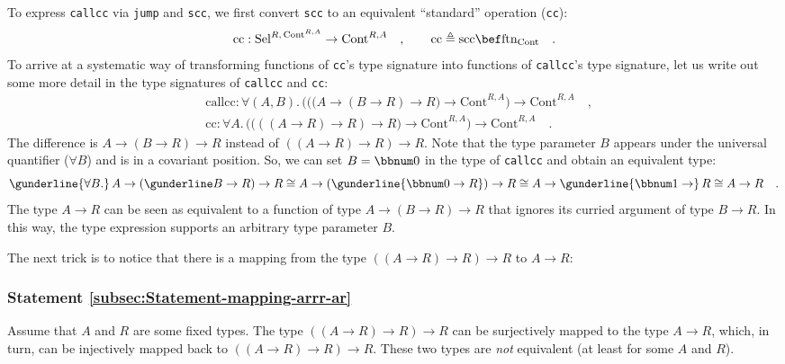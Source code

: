To express \lstinline!callcc! via \lstinline!jump! and \lstinline!scc!,
we first convert \lstinline!scc! to an equivalent \textsf{``}standard\textsf{''}
operation (\lstinline!cc!):
\[
\text{cc}:\text{Sel}^{R,\,\text{Cont}^{R,A}}\rightarrow\text{Cont}^{R,A}\quad,\quad\quad\text{cc}\triangleq\text{scc}\bef\text{ftn}_{\text{Cont}}\quad.
\]
To arrive at a systematic way of transforming functions of \lstinline!cc!\textsf{'}s
type signature into functions of \lstinline!callcc!\textsf{'}s type signature,
let us write out some more detail in the type signatures of \lstinline!callcc!
and \lstinline!cc!:
\begin{align*}
 & \text{callcc}:\forall(A,B).\,\big(\big((A\rightarrow(B\rightarrow R)\rightarrow R\big)\rightarrow\text{Cont}^{R,A}\big)\rightarrow\text{Cont}^{R,A}\quad,\\
 & \text{cc}:\forall A.\,\big(\big(((A\rightarrow R)\rightarrow R)\rightarrow R\big)\rightarrow\text{Cont}^{R,A}\big)\rightarrow\text{Cont}^{R,A}\quad.
\end{align*}
The difference is $A\rightarrow(B\rightarrow R)\rightarrow R$ instead
of $((A\rightarrow R)\rightarrow R)\rightarrow R$. Note that the
type parameter $B$ appears under the universal quantifier ($\forall B$)
and is in a covariant position. So, we can set $B=\bbnum 0$ in the
type of \lstinline!callcc! and obtain an equivalent type:
\[
\gunderline{\forall B.}\,A\rightarrow(\gunderline B\rightarrow R)\rightarrow R\cong A\rightarrow(\gunderline{\bbnum 0\rightarrow R})\rightarrow R\cong A\rightarrow\gunderline{\bbnum 1\rightarrow}\,R\cong A\rightarrow R\quad.
\]
The type $A\rightarrow R$ can be seen as equivalent to a function
of type $A\rightarrow(B\rightarrow R)\rightarrow R$ that ignores
its curried argument of type $B\rightarrow R$. In this way, the type
expression supports an arbitrary type parameter $B$.

The next trick is to notice that there is a mapping from the type
$((A\rightarrow R)\rightarrow R)\rightarrow R$ to $A\rightarrow R$:

\subsubsection{Statement \label{subsec:Statement-mapping-arrr-ar}\ref{subsec:Statement-mapping-arrr-ar}}

Assume that $A$ and $R$ are some fixed types. The type $((A\rightarrow R)\rightarrow R)\rightarrow R$
can be surjectively mapped to the type $A\rightarrow R$, which, in
turn, can be injectively mapped back to $((A\rightarrow R)\rightarrow R)\rightarrow R$.
These two types are \emph{not} equivalent (at least for some $A$
and $R$).

